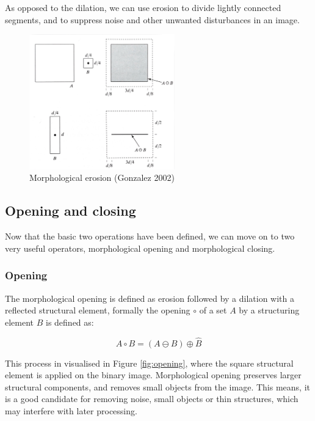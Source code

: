 \documentclass[
  digital,     %
  oneside,     %
  nosansbold,  %
  nocolorbold, %
  lof,         %
  lot,         %
]{fithesis4}
\begin{document}
As opposed to the dilation, we can use erosion to divide lightly connected
segments, and to suppress noise and other unwanted disturbances in an image.

\begin{figure}
    \begin{center}
        \includegraphics[width=6.3cm]{resources/morph_erosion.jpg}
    \end{center}
    \caption{Morphological erosion (Gonzalez 2002)} %
    \label{fig:morph_erosion}
\end{figure}

\subsection{Opening and closing}

Now that the basic two operations have been defined, we can move on to two
very useful operators, morphological opening and morphological closing.

\subsubsection{Opening}

The morphological opening is defined as erosion followed by a dilation with a
reflected structural element, formally the opening $\circ$ of a set $A$ by a structuring
element $B$ is defined as\cite{soile2004}:

$$A \circ B = (A \ominus B) \oplus \hat{B} $$

This process in visualised in Figure \ref{fig:opening}, where the square
structural element is applied on the binary image. Morphological opening
preserves larger structural components, and removes small objects from the
image. This means, it is a good candidate for removing noise, small objects or
thin structures, which may interfere with later processing.
\end{document}
